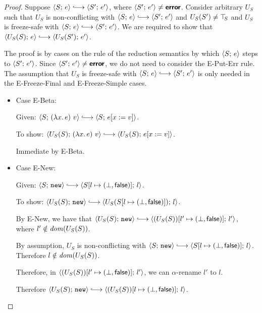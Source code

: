 \begin{proof}
  Suppose $\config{S}{e} \parstepsto \config{S'}{e'}$, where
  $\langle S';\, e' \rangle \neq \textbf{\textsf{error}}$.  Consider arbitrary $U_S$ such that
  $U_S$ is non-conflicting with $\config{S}{e} \parstepsto
  \config{S'}{e'}$ and $U_S(S') \neq \top\hspace{-0.85mm}_{S}$ and $U_S$ is freeze-safe
  with $\config{S}{e} \parstepsto \config{S'}{e'}$.  We are required
  to show that $\config{U_S(S)}{e} \parstepsto \config{U_S(S')}{e'}$.

  The proof is by cases on the rule of the reduction semantics by
  which $\langle S;\, e \rangle$ steps to $\langle S';\, e' \rangle$.  Since
  $\langle S';\, e' \rangle \neq \textbf{\textsf{error}}$, we do not need to consider the {\sc
    E-Put-Err} rule.  The assumption that $U_S$ is freeze-safe with
  $\config{S}{e} \parstepsto \config{S'}{e'}$ is only needed in the
  {\sc E-Freeze-Final} and {\sc E-Freeze-Simple} cases.

  \begin{itemize}

    \item Case {\sc E-Beta}:

      Given: $\config{S}{\app{(\lam{x}{e})}{v}} \parstepsto
      \config{S}{\subst{e}{x}{v}}$.

      To show: $\config{U_S(S)}{\app{(\lam{x}{e})}{v}} \parstepsto
      \config{U_S(S)}{\subst{e}{x}{v}}$.

      Immediate by {\sc E-Beta}.

    \item Case {\sc E-New}:

      Given: $\config{S}{\NEW} \parstepsto
      \config{\extS{S}{l}{\bot}{\frozenfalse}}{l}$.

      To show: $\config{U_S(S)}{\NEW} \parstepsto
      \config{U_S(\extS{S}{l}{\bot}{\frozenfalse})}{l}$.

      By {\sc E-New}, we have that $\config{U_S(S)}{\NEW} \parstepsto
      \config{\extS{(U_S(S))}{l'}{\bot}{\frozenfalse}}{l'}$, where $l'
      \notin \mathit{dom}(U_S(S))$.

      By assumption, $U_S$ is non-conflicting with $\config{S}{\NEW}
      \parstepsto \config{\extS{S}{l}{\bot}{\frozenfalse}}{l}$.
      Therefore $l \notin \mathit{dom}(U_S(S))$.

      Therefore, in
      $\langle (U_S(S))[l' \mapsto (\bot, \textsf{false})];\, l' \rangle$, we
      can $\alpha$-rename $l'$ to $l$.

      Therefore $\config{U_S(S)}{\NEW} \parstepsto
      \config{\extS{(U_S(S))}{l}{\bot}{\frozenfalse}}{l}$.


\end{itemize}
\end{proof}
